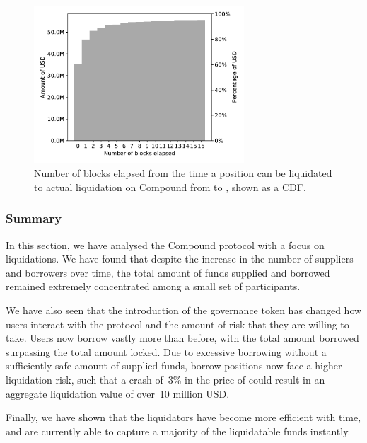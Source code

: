 \begin{figure}[tbp]
    \centering
    \includegraphics[width=0.7\textwidth]{./5b-economic-security/figures/time-to-liquidation.pdf}
    \caption[Number of blocks elapsed until liquidation]{Number of blocks elapsed from the time a position can be liquidated to actual liquidation on Compound from \StartDate to \EndDate, shown as a CDF.}
    \label{fig:blocks-spent}
\end{figure}

\subsubsection{Summary}
In this section, we have analysed the Compound protocol with a focus on liquidations.
We have found that despite the increase in the number of suppliers and borrowers over time, the total amount of funds supplied and borrowed remained extremely concentrated among a small set of participants.

We have also seen that the introduction of the  governance token has changed how users interact with the protocol and the amount of risk that they are willing to take.
Users now borrow vastly more than before, with the total amount borrowed surpassing the total amount locked.
Due to excessive borrowing without a sufficiently safe amount of supplied funds, borrow positions now face a higher liquidation risk, such that a crash of~3\% in the price of  could result in an aggregate liquidation value of over~10 million USD.

Finally, we have shown that the liquidators have become more efficient with time, and are currently able to capture a majority of the liquidatable funds instantly.
